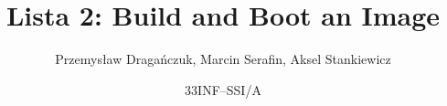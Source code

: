 


\title{Lista 2: Build and Boot an Image}
\author{Przemysław Dragańczuk, Marcin Serafin, Aksel Stankiewicz}
\date{33INF--SSI/A}



\maketitle
\newpage








